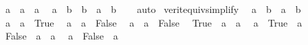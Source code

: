 \begin{isabellebody}
\ \ {\isacartoucheopen}{\isacharparenleft}{\kern0pt}a\ {\isasymlongrightarrow}\ {\isasymnot}a{\isacharparenright}{\kern0pt}\ {\isasymlongleftrightarrow}\ {\isasymnot}a{\isacartoucheclose}\isanewline
\ \ {\isacartoucheopen}{\isacharparenleft}{\kern0pt}{\isacharparenleft}{\kern0pt}a\ {\isasymlongrightarrow}\ b{\isacharparenright}{\kern0pt}\ {\isasymlongrightarrow}\ b{\isacharparenright}{\kern0pt}\ {\isasymlongleftrightarrow}\ a\ {\isasymor}\ b{\isacartoucheclose}\isanewline
%
\isadelimproof
\ \ %
\endisadelimproof
%
\isatagproof
{}\isamarkupfalse%
\ auto%
\endisatagproof
{\isafoldproof}%
%
\isadelimproof
\isanewline
%
\endisadelimproof
\isanewline
{}\isamarkupfalse%
\ verit{\isacharunderscore}{\kern0pt}equiv{\isacharunderscore}{\kern0pt}simplify{\isacharcolon}{\kern0pt}\isanewline
\ \ {\isacartoucheopen}{\isacharparenleft}{\kern0pt}{\isacharparenleft}{\kern0pt}{\isasymnot}a{\isacharparenright}{\kern0pt}\ {\isacharequal}{\kern0pt}\ {\isacharparenleft}{\kern0pt}{\isasymnot}b{\isacharparenright}{\kern0pt}{\isacharparenright}{\kern0pt}\ {\isasymlongleftrightarrow}\ {\isacharparenleft}{\kern0pt}a\ {\isacharequal}{\kern0pt}\ b{\isacharparenright}{\kern0pt}{\isacartoucheclose}\isanewline
\ \ {\isacartoucheopen}{\isacharparenleft}{\kern0pt}a\ {\isacharequal}{\kern0pt}\ a{\isacharparenright}{\kern0pt}\ {\isasymlongleftrightarrow}\ True{\isacartoucheclose}\isanewline
\ \ {\isacartoucheopen}{\isacharparenleft}{\kern0pt}a\ {\isacharequal}{\kern0pt}\ {\isacharparenleft}{\kern0pt}{\isasymnot}a{\isacharparenright}{\kern0pt}{\isacharparenright}{\kern0pt}\ {\isasymlongleftrightarrow}\ False{\isacartoucheclose}\isanewline
\ \ {\isacartoucheopen}{\isacharparenleft}{\kern0pt}{\isacharparenleft}{\kern0pt}{\isasymnot}a{\isacharparenright}{\kern0pt}\ {\isacharequal}{\kern0pt}\ a{\isacharparenright}{\kern0pt}\ {\isasymlongleftrightarrow}\ False{\isacartoucheclose}\isanewline
\ \ {\isacartoucheopen}{\isacharparenleft}{\kern0pt}True\ {\isacharequal}{\kern0pt}\ a{\isacharparenright}{\kern0pt}\ {\isasymlongleftrightarrow}\ a{\isacartoucheclose}\isanewline
\ \ {\isacartoucheopen}{\isacharparenleft}{\kern0pt}a\ {\isacharequal}{\kern0pt}\ True{\isacharparenright}{\kern0pt}\ {\isasymlongleftrightarrow}\ a{\isacartoucheclose}\isanewline
\ \ {\isacartoucheopen}{\isacharparenleft}{\kern0pt}False\ {\isacharequal}{\kern0pt}\ a{\isacharparenright}{\kern0pt}\ {\isasymlongleftrightarrow}\ {\isasymnot}a{\isacartoucheclose}\isanewline
\ \ {\isacartoucheopen}{\isacharparenleft}{\kern0pt}a\ {\isacharequal}{\kern0pt}\ False{\isacharparenright}{\kern0pt}\ {\isasymlongleftrightarrow}\ {\isasymnot}a{\isacartoucheclose}\isanewline

\end{isabellebody}
